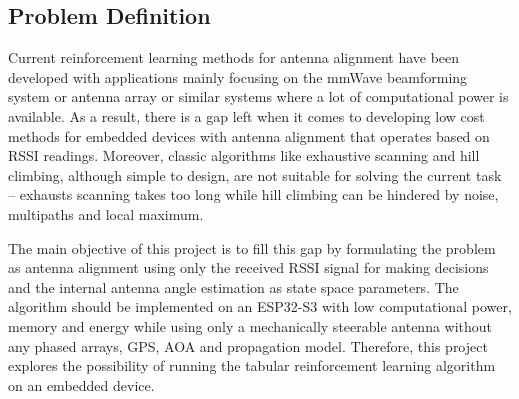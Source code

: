 \subsection{Problem Definition}

Current reinforcement learning methods for antenna alignment have been developed with applications mainly focusing on the mmWave beamforming system or antenna array or similar systems where a lot of computational power is available. As a result, there is a gap left when it comes to developing low cost methods for embedded devices with antenna alignment that operates based on RSSI readings. Moreover, classic algorithms like exhaustive scanning and hill climbing, although simple to design, are not suitable for solving the current task – exhausts scanning takes too long while hill climbing can be hindered by noise, multipaths and local maximum.

The main objective of this project is to fill this gap by formulating the problem as antenna alignment using only the received RSSI signal for making decisions and the internal antenna angle estimation as state space parameters. The algorithm should be implemented on an ESP32-S3 with low computational power, memory and energy while using only a mechanically steerable antenna without any phased arrays, GPS, AOA and propagation model. Therefore, this project explores the possibility of running the tabular reinforcement learning algorithm on an embedded device.